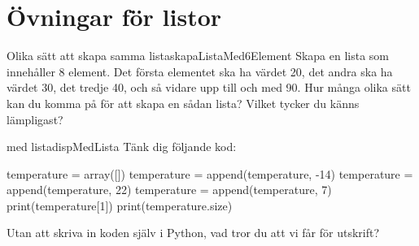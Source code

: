 \vspace{10pt}
\begin{python}
[2. 3. 4. 5.]
\end{python}
\newpage

\section{Övningar för listor}

\begin{matteovning}{Olika sätt att skapa samma lista}{skapaListaMed6Element}
Skapa en lista som innehåller 8 element. Det första elementet ska ha värdet 20, det andra ska ha värdet 30, det tredje 40, och så vidare upp till och med 90. Hur många olika sätt kan du komma på för att skapa en sådan lista? Vilket tycker du känns lämpligast?
\end{matteovning}


\begin{matteovning}{ med lista}{dispMedLista}
Tänk dig följande kod:
\vspace{10pt}
\begin{python}
temperature = array([])
temperature = append(temperature, -14)
temperature = append(temperature, 22)
temperature = append(temperature, 7)
print(temperature[1])
print(temperature.size)
\end{python}
Utan att skriva in koden själv i Python, vad tror du att vi får för utskrift?
\end{matteovning}
